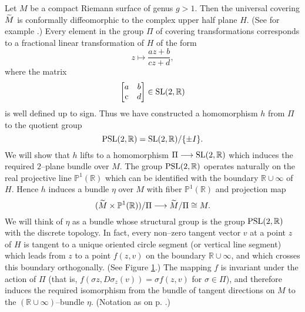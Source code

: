 \documentclass[../main]{subfiles}
\begin{document}
Let $M$ be a compact Riemann surface of genus $g > 1$. Then the universal covering ${\xtilde M}$ is conformally diffeomorphic to the complex upper half plane $H$. (See for example \cite{springer2001introduction}.) Every element in the group $\Pi$ of covering transformations corresponds to a fractional linear transformation of $H$ of the form \[z \mapsto \dfrac{az + b}{cz + d},\] where the matrix \[\begin{bmatrix}a & b \\ \operatorname{c} & d\end{bmatrix} \in \operatorname{SL}(2, \mathbb R)\] is well defined up to sign. Thus we have constructed a homomorphism $h$ from $\Pi$ to the quotient group \[\operatorname{PSL}(2, \mathbb R) = \operatorname{SL}(2, \mathbb R)/\{\pm I\}.\] We will show that $h$ lifts to a homomorphism $\Pi \longrightarrow \operatorname{SL}(2, \mathbb R)$ which induces the required $2$--plane bundle over $M$. 
The group $\operatorname{PSL}(2, \mathbb R)$ operates naturally on the real projective line ${\mathbb P}^1(\mathbb R)$ which can be identified with the boundary ${\mathbb R} \cup \infty$ of $H$. Hence $h$ induces a bundle $\eta$ over $M$ with fiber ${\mathbb P}^1(\mathbb R)$ and projection map \[({\xtilde M} \times {\mathbb P}^1(\mathbb R))/\Pi \longrightarrow {\xtilde M}/\Pi \cong M.\] We will think of $\eta$ as a bundle whose structural group is the group $\operatorname{PSL}(2, \mathbb R)$ with the discrete topology.  In fact, every non--zero tangent vector $v$ at a point $z$ of $H$ is tangent to a unique oriented circle segment (or vertical line segment) which leads from $z$ to a point $f(z, v)$ on the boundary ${\mathbb R} \cup \infty$, and which crosses this boundary orthogonally. (See Figure \ref{fig:figure12}.) The mapping $f$ is invariant under the action of $\Pi$ (that is, $f(\sigma z, D \sigma_z(v)) = \sigma f(z, v)$ for $\sigma \in \Pi$), and therefore induces the required isomorphism from the bundle of tangent directions on $M$ to the $({\mathbb R} \cup \infty)$--bundle $\eta$. (Notation as on p. \pageref{lem:1.4}.) 

\begin{figure}[ht]
    \centering
    \caption{}
    \label{fig:figure12}
\end{figure}
\end{document}
